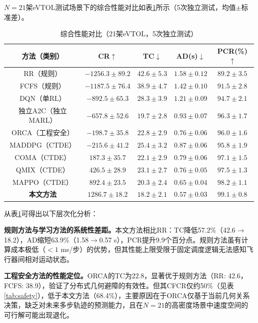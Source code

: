 \documentclass[12pt,a4paper,UTF8]{ctexart}
\begin{document}
$N=21$架eVTOL测试场景下的综合性能对比如表\ref{tab:comparison}所示（5次独立测试，均值$\pm$标准差）。

\begin{table}[H]
    \centering
    \caption{综合性能对比（21架eVTOL，5次独立测试）}
    \label{tab:comparison}
    \begin{tabular}{|c|c|c|c|c|}
        \hline
        \textbf{方法（类别）} & \textbf{CR$\uparrow$} & \textbf{TC$\downarrow$} & \textbf{AD(s)$\downarrow$} & \textbf{PCR(\%)$\uparrow$} \\
        \hline
        RR（规则） & $-1256.3\pm89.2$ & $42.6\pm5.3$ & $1.58\pm0.12$ & $89.2\pm3.5$ \\
        FCFS（规则） & $-1187.5\pm76.4$ & $38.9\pm4.7$ & $1.42\pm0.10$ & $91.5\pm2.8$ \\
        DQN（单RL） & $-892.5\pm65.3$ & $28.3\pm3.9$ & $1.21\pm0.09$ & $94.7\pm2.1$ \\
        独立A2C（独立MARL） & $-657.8\pm52.6$ & $19.7\pm2.8$ & $0.93\pm0.07$ & $96.3\pm1.7$ \\
        ORCA（工程安全） & $-198.7\pm35.8$ & $22.8\pm2.9$ & $0.76\pm0.06$ & $96.0\pm1.6$ \\
        MADDPG（CTDE） & $-215.6\pm41.2$ & $25.4\pm3.2$ & $0.87\pm0.06$ & $95.8\pm1.9$ \\
        COMA（CTDE） & $187.3\pm35.7$ & $22.1\pm2.9$ & $0.79\pm0.06$ & $97.1\pm1.5$ \\
        QMIX（CTDE） & $426.5\pm28.9$ & $23.1\pm2.7$ & $0.76\pm0.05$ & $97.5\pm1.3$ \\
        MAPPO（CTDE） & $892.4\pm23.5$ & $20.3\pm2.4$ & $0.65\pm0.04$ & $98.2\pm1.1$ \\
        \textbf{本文方法} & $\mathbf{1286.7\pm18.2}$ & $\mathbf{18.2\pm2.1}$ & $\mathbf{0.57\pm0.03}$ & $\mathbf{99.1\pm0.8}$ \\
        \hline
    \end{tabular}
\end{table}

从表\ref{tab:comparison}可得出以下层次化分析：

\textbf{规则方法与学习方法的系统性差距。}本文方法相比RR：TC降低57.2\%（42.6$\to$18.2），AD缩短63.9\%（1.58$\to$0.57 s），PCR提升9.9个百分点。规则方法虽有计算成本极低（$<1$ ms/步）的优势，但其性能上限受限于固定调度逻辑无法感知飞行器间相对运动状态。

\textbf{工程安全方法的性能定位。}ORCA的TC为22.8，显著优于规则方法（RR: 42.6，FCFS: 38.9），验证了分布式几何避障的有效性。但其CFCR仅约50\%（见表\ref{tab:safety}），低于本文方法（68.4\%），主要原因在于ORCA仅基于当前几何关系决策，缺乏对未来多步轨迹的预测能力，且在$N=21$的高密度场景中速度空间的可行解可能出现退化。
\end{document}
